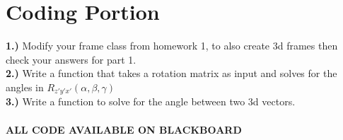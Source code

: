 \documentclass{article}
\begin{document}
\section{Coding Portion}
\textbf{1.) } Modify your frame class from homework 1, to also create 3d frames then check your answers for part 1.\\
\textbf{2.) } Write a function that takes a rotation matrix as input and solves for the angles in $R_{z'y'x'}(\alpha,\beta,\gamma)$\\
\textbf{3.) } Write a function to solve for the angle between two 3d vectors.\\\\
\textbf{ALL CODE AVAILABLE ON BLACKBOARD}
\end{document}
